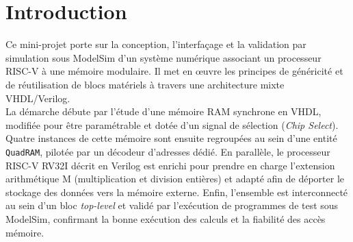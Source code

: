 \section{Introduction}

Ce mini-projet porte sur la conception, l'interfaçage et la validation par simulation sous ModelSim d'un système numérique associant un processeur RISC-V à une mémoire modulaire. Il met en œuvre les principes de généricité et de réutilisation de blocs matériels à travers une architecture mixte VHDL/Verilog. \\

La démarche débute par l'étude d'une mémoire RAM synchrone en VHDL, modifiée pour être paramétrable et dotée d'un signal de sélection (\textit{Chip Select}). Quatre instances de cette mémoire sont ensuite regroupées au sein d'une entité \texttt{QuadRAM}, pilotée par un décodeur d'adresses dédié. En parallèle, le processeur RISC-V RV32I décrit en Verilog est enrichi pour prendre en charge l'extension arithmétique M (multiplication et division entières) et adapté afin de déporter le stockage des données vers la mémoire externe. Enfin, l'ensemble est interconnecté au sein d'un bloc \textit{top-level} et validé par l'exécution de programmes de test sous ModelSim, confirmant la bonne exécution des calculs et la fiabilité des accès mémoire.
